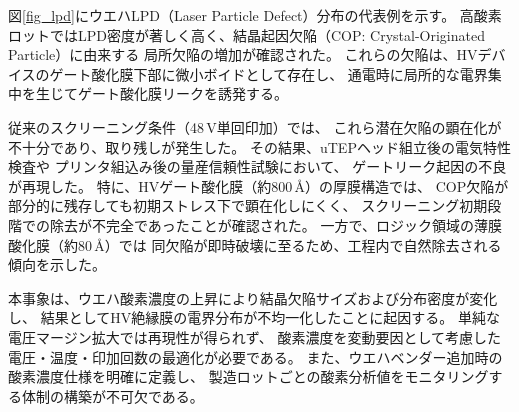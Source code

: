 \documentclass[twocolumn]{ieeetran}
\begin{document}
図\ref{fig_lpd}にウエハLPD（Laser Particle Defect）分布の代表例を示す。
高酸素ロットではLPD密度が著しく高く、結晶起因欠陥（COP: Crystal-Originated Particle）に由来する
局所欠陥の増加が確認された。
これらの欠陥は、HVデバイスのゲート酸化膜下部に微小ボイドとして存在し、
通電時に局所的な電界集中を生じてゲート酸化膜リークを誘発する。

従来のスクリーニング条件（48\,V単回印加）では、
これら潜在欠陥の顕在化が不十分であり、取り残しが発生した。
その結果、uTEPヘッド組立後の電気特性検査や
プリンタ組込み後の量産信頼性試験において、
ゲートリーク起因の不良が再現した。
特に、HVゲート酸化膜（約800\,\AA）の厚膜構造では、
COP欠陥が部分的に残存しても初期ストレス下で顕在化しにくく、
スクリーニング初期段階での除去が不完全であったことが確認された。
一方で、ロジック領域の薄膜酸化膜（約80\,\AA）では
同欠陥が即時破壊に至るため、工程内で自然除去される傾向を示した。

本事象は、ウエハ酸素濃度の上昇により結晶欠陥サイズおよび分布密度が変化し、
結果としてHV絶縁膜の電界分布が不均一化したことに起因する。
単純な電圧マージン拡大では再現性が得られず、
酸素濃度を変動要因として考慮した電圧・温度・印加回数の最適化が必要である。
また、ウエハベンダー追加時の酸素濃度仕様を明確に定義し、
製造ロットごとの酸素分析値をモニタリングする体制の構築が不可欠である。
\end{document}

